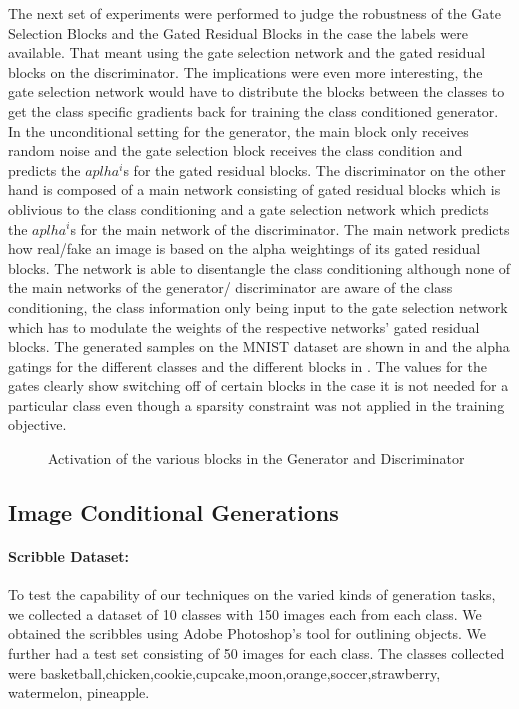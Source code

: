 The next set of experiments were performed to judge the robustness of the Gate Selection Blocks and the Gated Residual Blocks in the case the labels were available. That meant using the gate selection network and the gated residual blocks on the discriminator. The implications were even more interesting, the gate selection network would have to distribute the blocks between the classes to get the class specific gradients back for training the class conditioned generator. In the unconditional setting for the generator, the main block only receives random noise and the gate selection block receives the class condition and predicts the $aplha^i$s for the gated residual blocks. The discriminator on the other hand is composed of a main network consisting of gated residual blocks which is oblivious to the class conditioning and a gate selection network which predicts the $aplha^i$s for the main network of the discriminator. The main network predicts how real/fake an image is based on the alpha weightings of its gated residual blocks. The network is able to disentangle the class conditioning although none of the main networks of the generator/ discriminator are aware of the class conditioning, the class information only being input to the gate selection network which has to modulate the weights of the respective networks' gated residual blocks. The generated samples on the MNIST dataset are shown in  and the alpha gatings for the different classes and the different blocks in . The values for the gates clearly show switching off of certain blocks in the case it is not needed for a particular class even though a sparsity constraint was not applied in the training objective.


\begin{figure}%
    \centering
    \caption{Activation of the various blocks in the Generator and Discriminator}
    \label{fig:mnist_act}
    \vspace{-3mm}
\end{figure}


\subsection{Image Conditional Generations}

\paragraph{Scribble Dataset:}
To test the capability of our techniques on the varied kinds of generation tasks, we collected a dataset of 10 classes with 150 images each from each class. We obtained the scribbles using Adobe Photoshop's tool for outlining objects. We further had a test set consisting of 50 images for each class. The classes collected were basketball,chicken,cookie,cupcake,moon,orange,soccer,strawberry, watermelon, pineapple. 

